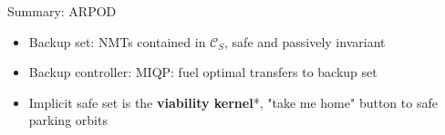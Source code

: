 \begin{frame}{Summary: ARPOD}
  \small
  \begin{itemize}
    \item Backup set: NMTs contained in $\mathcal{C}_S$, safe and passively invariant
    \item Backup controller: MIQP: fuel optimal transfers to backup set
    \item Implicit safe set is the \textbf{viability kernel}*, "take me home" button to safe parking orbits
  \end{itemize}
\end{frame}

